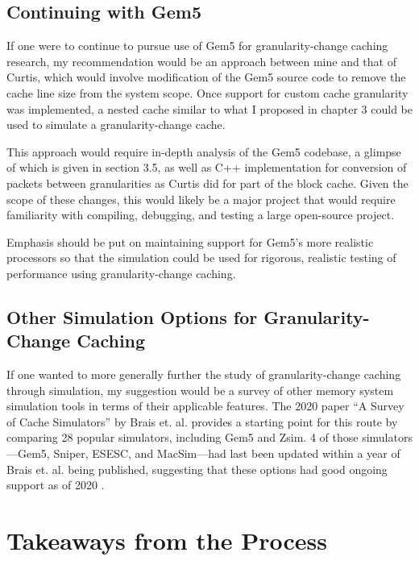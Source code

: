 \documentclass[12pt,twoside]{reedthesis}
\begin{document}
	\subsection*{Continuing with Gem5}

	If one were to continue to pursue use of Gem5 for granularity-change caching research, my recommendation would be an approach between mine and that of Curtis, which would involve modification of the Gem5 source code to remove the cache line size from the system scope. Once support for custom cache granularity was implemented, a nested cache similar to what I proposed in chapter 3 could be used to simulate a granularity-change cache.
	
	This approach would require in-depth analysis of the Gem5 codebase, a glimpse of which is given in section 3.5, as well as C++ implementation for conversion of packets between granularities as Curtis did for part of the block cache. Given the scope of these changes, this would likely be a major project that would require familiarity with compiling, debugging, and testing a large open-source project.

	Emphasis should be put on maintaining support for Gem5's more realistic processors so that the simulation could be used for rigorous, realistic testing of performance using granularity-change caching.

	\subsection*{Other Simulation Options for Granularity-Change Caching}

	If one wanted to more generally further the study of granularity-change caching through simulation, my suggestion would be a survey of other memory system simulation tools in terms of their applicable features. The 2020 paper ``A Survey of Cache Simulators'' by Brais et. al. provides a starting point for this route by comparing 28 popular simulators, including Gem5 and Zsim. 4 of those simulators---Gem5, Sniper, ESESC, and MacSim---had last been updated within a year of Brais et. al. being published, suggesting that these options had good ongoing support as of 2020 \cite{brais}.

\section{Takeaways from the Process}
\end{document}
